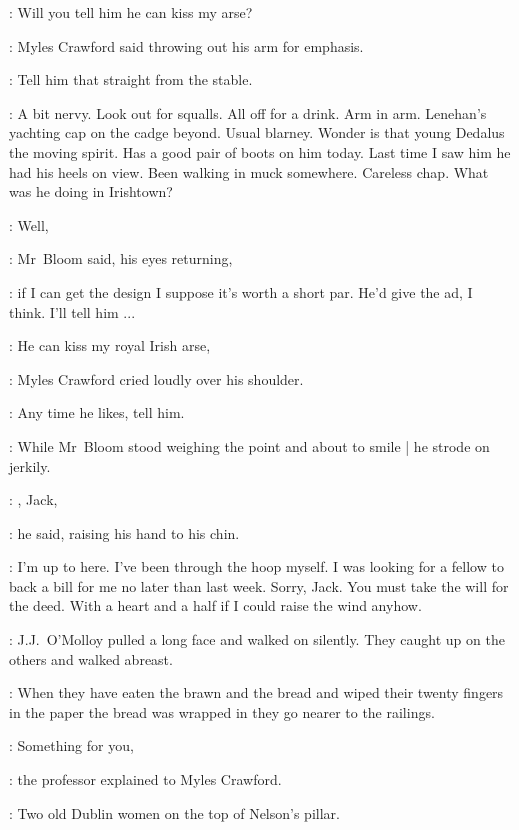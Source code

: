 
\crawford:
Will you tell him he can kiss my arse?

:
Myles Crawford said
throwing out his arm for emphasis.

\crawford:
Tell him that straight from the stable.

\BloomInt:
A bit nervy.
Look out for squalls.
All off for a drink.
Arm in arm.
Lenehan's yachting cap on the cadge beyond.
Usual blarney.
Wonder is that young Dedalus the moving spirit.
Has a good pair of boots on him today.
Last time I saw him he had his heels on view.
Been walking in muck somewhere.
Careless chap.
What was he doing in Irishtown?

\Bloom:
Well,

:
Mr~Bloom said,
his eyes returning,

\Bloom:
if I can get the design
I suppose it's worth a short par.
He'd give the ad, I think.
I'll tell him ...



\crawford:
He can kiss my royal Irish arse,

:
Myles Crawford cried loudly over his shoulder.

\crawford:
Any time he likes, tell him.


:
While Mr~Bloom stood weighing the point
and about to smile |
he strode on jerkily.



\crawford:
, Jack,

:
he said,
raising his hand to his chin.

\crawford:
I'm up to here.
I've been through the hoop myself.
I was looking for a fellow to back a bill for me no later than last week.
Sorry, Jack.
You must take the will for the deed.
With a heart and a half if I could raise the wind anyhow.

:
J.J.~O'Molloy pulled a long face and walked on silently.
They caught up on the others and walked abreast.

\Stephen:
When they have eaten the brawn and the bread
and wiped their twenty fingers in the paper the bread was wrapped in
they go nearer to the railings.

\machugh:
Something for you,

:
the professor explained to Myles Crawford.

\machugh:
Two old Dublin women on the top of Nelson's pillar.


